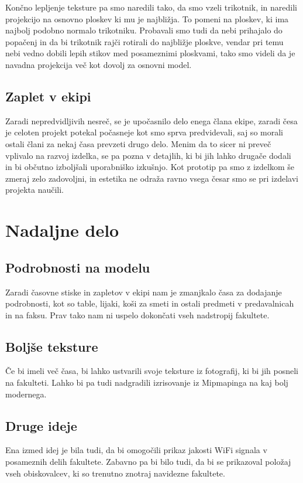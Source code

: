 \documentclass[10pt,a4paper]{article}
\begin{document}
Končno lepljenje teksture pa smo naredili tako, da smo vzeli trikotnik, in naredili projekcijo na osnovno ploskev ki mu je najbližja. To pomeni na ploskev, ki ima najbolj podobno normalo trikotniku. Probavali smo tudi da nebi prihajalo do popačenj in da bi trikotnik rajči rotirali do najbližje ploskve, vendar pri temu nebi vedno dobili lepih stikov med posameznimi ploskvami, tako smo videli da je navadna projekcija več kot dovolj za osnovni model.  

\subsection{Zaplet v ekipi}
Zaradi nepredvidljivih nesreč, se je upočasnilo delo enega člana ekipe, zaradi česa je celoten projekt potekal počasneje kot smo sprva predvidevali, saj so morali ostali člani za nekaj časa prevzeti drugo delo. Menim da to sicer ni preveč vplivalo na razvoj izdelka, se pa pozna v detajlih, ki bi jih lahko drugače dodali in bi občutno izboljšali uporabniško izkušnjo. Kot prototip pa smo z izdelkom še zmeraj zelo zadovoljni, in estetika ne odraža ravno vsega česar smo se pri izdelavi projekta naučili.
\pagebreak
\section{Nadaljne delo}
\subsection{Podrobnosti na modelu}
Zaradi časovne stiske in zapletov v ekipi nam je zmanjkalo časa za dodajanje podrobnosti, kot so 
table, lijaki, koši za smeti in ostali predmeti v predavalnicah in na faksu. Prav
tako nam ni uspelo dokončati vseh nadstropij fakultete. 
\subsection{Boljše teksture}
Če bi imeli več časa, bi lahko ustvarili svoje teksture iz fotografij, ki bi 
jih posneli na fakulteti. Lahko bi pa tudi nadgradili izrisovanje iz Mipmapinga
na kaj bolj modernega. 
\subsection{Druge ideje}
Ena izmed idej je bila tudi, da bi omogočili prikaz jakosti WiFi signala v posameznih delih 
fakultete. Zabavno pa bi bilo tudi, da bi se prikazoval položaj vseh obiskovalcev, ki so trenutno
znotraj navidezne fakultete.
\pagebreak
\end{document}
